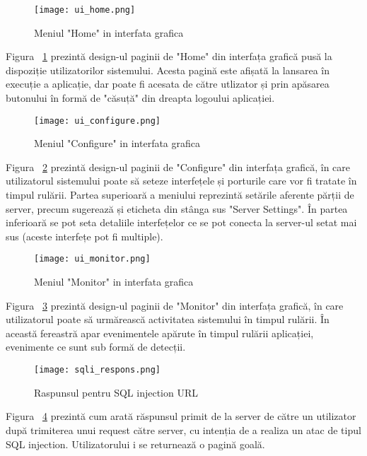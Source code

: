 \begin{figure}[h]
	\centering
	\texttt{[image: ui\_home.png]}
	\caption{Meniul "Home" in interfata grafica}
	\label{fig:ui_home}
\end{figure}
Figura ~\ref{fig:ui_home}  prezintă design-ul paginii de "Home" din interfața grafică pusă la dispoziție utilizatorilor sistemului. Acesta pagină este afișată la lansarea în execuție a aplicație, dar poate fi acesata de către utlizator și prin apăsarea butonului în formă de "căsuță" din dreapta logoului aplicației. \\

\begin{figure}[h]
	\centering
	\texttt{[image: ui\_configure.png]}
	\caption{Meniul "Configure" in interfata grafica}
	\label{fig:ui_configure}
\end{figure}
Figura ~\ref{fig:ui_configure}  prezintă design-ul paginii de "Configure" din interfața grafică, în care utilizatorul sistemului poate să seteze interfețele și porturile care vor fi tratate în timpul rulării. Partea superioară a meniului reprezintă setările aferente părții de server, precum sugerează și eticheta din stânga sus "Server Settings". În partea inferioară se pot seta detaliile interfețelor ce se pot conecta la server-ul setat mai sus (aceste interfețe pot fi multiple).  \\

\begin{figure}[h]
	\centering
	\texttt{[image: ui\_monitor.png]}
	\caption{Meniul "Monitor" in interfata grafica}
	\label{fig:ui_monitor}
\end{figure}
Figura ~\ref{fig:ui_monitor}  prezintă design-ul paginii de "Monitor" din interfața grafică, în care utilizatorul poate să urmărească activitatea sistemului în timpul rulării. În această fereastră apar evenimentele apărute în timpul rulării aplicației, evenimente ce sunt sub formă de detecții. \\

\begin{figure}[h]
	\centering
	\texttt{[image: sqli\_respons.png]}
	\caption{Raspunsul pentru SQL injection URL}
	\label{fig:sqli_respons}
\end{figure}

Figura ~\ref{fig:sqli_respons}  prezintă cum arată răspunsul primit de la server de către un utilizator după trimiterea unui request către server, cu intenția de a realiza un atac de tipul SQL injection. Utilizatorului i se returnează o pagină goală. \\
\newpage

